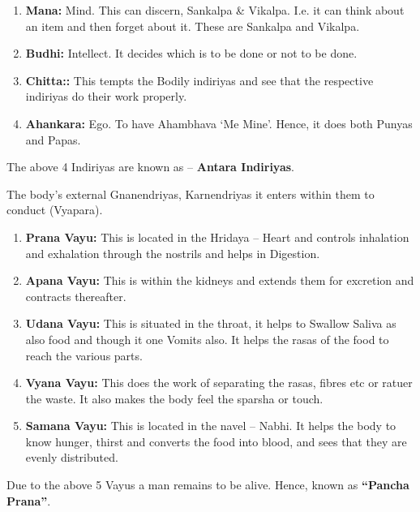\begin{enumerate}
\item \textbf{Mana:} Mind. This can discern, Sankalpa \& Vikalpa. I.e. it can think about an item and then forget about it. These are Sankalpa and Vikalpa.

 \item \textbf{Budhi:} Intellect. It decides which is to be done or not to be done.

 \item \textbf{Chitta::} This tempts the Bodily indiriyas and see that the respective indiriyas do their work properly.

 \item \textbf{Ahankara:} Ego. To have Ahambhava ‘Me Mine’. Hence, it does both Punyas and Papas.

\end{enumerate}

The above 4 Indiriyas are known as – \textbf{Antara Indiriyas}.

The body's external Gnanendriyas, Karnendriyas it enters within them to conduct (Vyapara).

\begin{enumerate}
\item \textbf{Prana Vayu:} This is located in the Hridaya – Heart and controls inhalation and exhalation through the nostrils and helps in Digestion.

 \item \textbf{Apana Vayu:} This is within the kidneys and extends them for excretion and contracts thereafter.

 \item \textbf{Udana Vayu:} This is situated in the throat, it helps to Swallow Saliva as also food and though it one Vomits also. It helps the rasas of the food to reach the various parts.

 \item \textbf{Vyana Vayu:} This does the work of separating the rasas, fibres etc or ratuer the waste. It also makes the body feel the sparsha or touch.

 \item \textbf{Samana Vayu:} This is located in the navel – Nabhi. It helps the body to know hunger, thirst and converts the food into blood, and sees that they are evenly distributed.

\end{enumerate}

Due to the above 5 Vayus a man remains to be alive. Hence, known as \textbf{“Pancha Prana”}.

